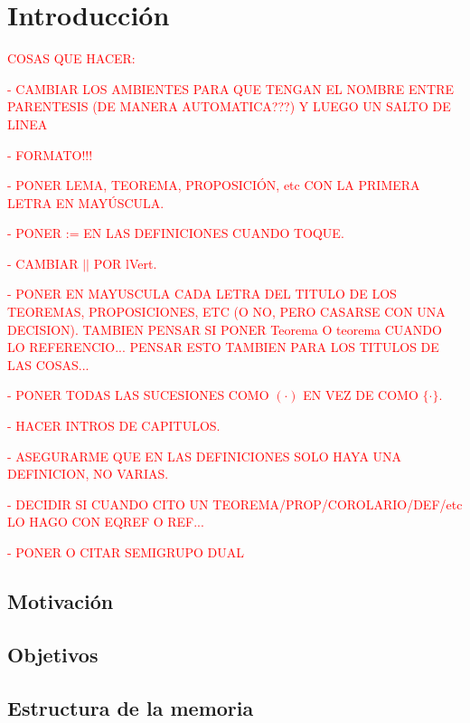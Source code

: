 \chapter*{Introducción}
\label{ch:introduccion}

\textcolor{red}{COSAS QUE HACER:}

\textcolor{red}{- CAMBIAR LOS AMBIENTES PARA QUE TENGAN EL NOMBRE ENTRE PARENTESIS (DE MANERA AUTOMATICA???) Y LUEGO UN SALTO DE LINEA}

\textcolor{red}{- FORMATO!!!}

\textcolor{red}{- PONER LEMA, TEOREMA, PROPOSICIÓN, etc CON LA PRIMERA LETRA EN MAYÚSCULA.}

\textcolor{red}{- PONER := EN LAS DEFINICIONES CUANDO TOQUE.}

\textcolor{red}{- CAMBIAR $||$ POR lVert.}

\textcolor{red}{- PONER EN MAYUSCULA CADA LETRA DEL TITULO DE LOS TEOREMAS, PROPOSICIONES, ETC (O NO, PERO CASARSE CON UNA DECISION). TAMBIEN PENSAR SI PONER Teorema O teorema CUANDO LO REFERENCIO... PENSAR ESTO TAMBIEN PARA LOS TITULOS DE LAS COSAS...}

\textcolor{red}{- PONER TODAS LAS SUCESIONES COMO $( \cdot )$ EN VEZ DE COMO $\{ \cdot \}$.}

\textcolor{red}{- HACER INTROS DE CAPITULOS.}

\textcolor{red}{- ASEGURARME QUE EN LAS DEFINICIONES SOLO HAYA UNA DEFINICION, NO VARIAS.}

\textcolor{red}{- DECIDIR SI CUANDO CITO UN TEOREMA/PROP/COROLARIO/DEF/etc LO HAGO CON EQREF O REF...}

\textcolor{red}{- PONER O CITAR SEMIGRUPO DUAL}

\section*{Motivación}


\section*{Objetivos}


\section*{Estructura de la memoria}

